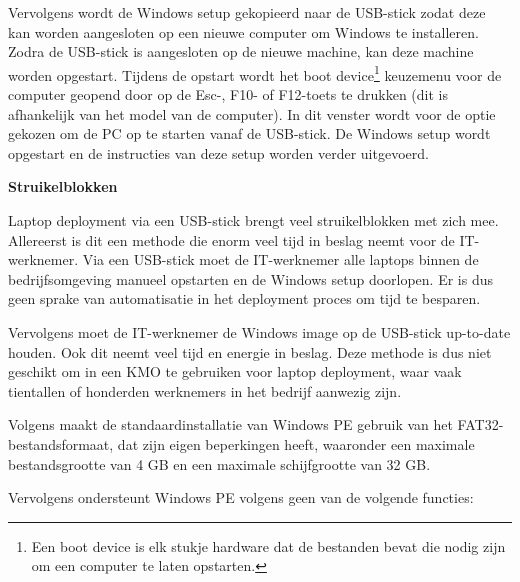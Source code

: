 Vervolgens wordt de Windows setup gekopieerd naar de USB-stick zodat deze kan worden aangesloten op een nieuwe computer om Windows te installeren. Zodra de USB-stick is aangesloten op de nieuwe machine, kan deze machine worden opgestart. Tijdens de opstart wordt het boot device\footnote{Een boot device is elk stukje hardware dat de bestanden bevat die nodig zijn om een computer te laten opstarten.} keuzemenu voor de computer geopend door op de Esc-, F10- of F12-toets te drukken (dit is afhankelijk van het model van de computer). In dit venster wordt voor de optie gekozen om de PC op te starten vanaf de USB-stick. De Windows setup wordt opgestart en de instructies van deze setup worden verder uitgevoerd.\autocite{EliotSeattle2021}

\textbf{Struikelblokken}

Laptop deployment via een USB-stick brengt veel struikelblokken met zich mee. Allereerst is dit een methode die enorm veel tijd in beslag neemt voor de IT-werknemer. Via een USB-stick moet de IT-werknemer alle laptops binnen de bedrijfsomgeving manueel opstarten en de Windows setup doorlopen. Er is dus geen sprake van automatisatie in het deployment proces om tijd te besparen.

Vervolgens moet de IT-werknemer de Windows image op de USB-stick up-to-date houden. Ook dit neemt veel tijd en energie in beslag. Deze methode is dus niet geschikt om in een KMO te gebruiken voor laptop deployment, waar vaak tientallen of honderden werknemers in het bedrijf aanwezig zijn.

Volgens \textcite{tedhudek2021} maakt de standaardinstallatie van Windows PE  gebruik van het FAT32-bestandsformaat, dat zijn eigen beperkingen heeft, waaronder een maximale bestandsgrootte van 4 GB en een maximale schijfgrootte van 32 GB.

Vervolgens ondersteunt Windows PE volgens \textcite{tedhudek2021} geen van de volgende functies:

